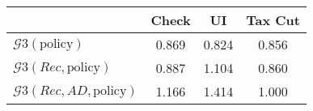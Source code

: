 \begin{tabular}{@{}lccc@{}} 
\toprule 
                          & Check      & UI    & Tax Cut    \\  \midrule 
$\mathcal{G}3(\text{policy})$ & 0.869  & 0.824  & 0.856     \\ 
$\mathcal{G}3(Rec,\text{policy})$ & 0.887  & 1.104  & 0.860     \\ 
$\mathcal{G}3(Rec, AD,\text{policy})$ & 1.166  & 1.414  & 1.000     \\ 
\end{tabular}  
